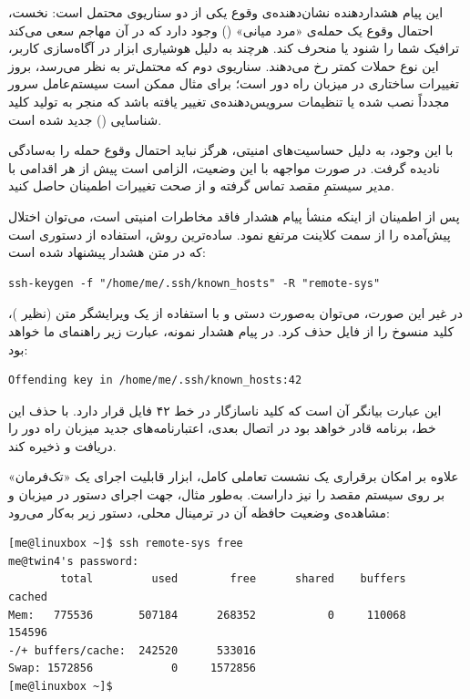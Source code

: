 این پیام هشداردهنده نشان‌دهنده‌ی وقوع یکی از دو سناریوی محتمل است: نخست، احتمال وقوع یک حمله‌ی «مرد میانی» () وجود دارد که در آن مهاجم سعی می‌کند ترافیک شما را شنود یا منحرف کند. هرچند به دلیل هوشیاری ابزار  در آگاه‌سازی کاربر، این نوع حملات کمتر رخ می‌دهند. سناریوی دوم که محتمل‌تر به نظر می‌رسد، بروز تغییرات ساختاری در میزبان راه دور است؛ برای مثال ممکن است سیستم‌عامل سرور مجدداً نصب شده یا تنظیمات سرویس‌دهنده‌ی  تغییر یافته باشد که منجر به تولید کلید شناسایی () جدید شده است.

با این وجود، به دلیل حساسیت‌های امنیتی، هرگز نباید احتمال وقوع حمله را به‌سادگی نادیده گرفت. در صورت مواجهه با این وضعیت، الزامی است پیش از هر اقدامی با مدیر سیستمِ مقصد تماس گرفته و از صحت تغییرات اطمینان حاصل کنید.

پس از اطمینان از اینکه منشأ پیام هشدار فاقد مخاطرات امنیتی است، می‌توان اختلال پیش‌آمده را از سمت کلاینت مرتفع نمود. ساده‌ترین روش، استفاده از دستوری است که در متن هشدار پیشنهاد شده است:

\begin{latin}
\begin{lstlisting}
ssh-keygen -f "/home/me/.ssh/known_hosts" -R "remote-sys"
\end{lstlisting}
\end{latin}

در غیر این صورت، می‌توان به‌صورت دستی و با استفاده از یک ویرایشگر متن (نظیر )، کلید منسوخ را از فایل  حذف کرد. در پیام هشدار نمونه، عبارت زیر راهنمای ما خواهد بود:

\begin{latin}
\begin{lstlisting}
Offending key in /home/me/.ssh/known_hosts:42
\end{lstlisting}
\end{latin}

این عبارت بیانگر آن است که کلید ناسازگار در خط ۴۲ فایل  قرار دارد. با حذف این خط، برنامه  قادر خواهد بود در اتصال بعدی، اعتبارنامه‌های جدید میزبان راه دور را دریافت و ذخیره کند.

علاوه بر امکان برقراری یک نشست تعاملی کامل، ابزار  قابلیت اجرای یک «تک‌فرمان» بر روی سیستم مقصد را نیز داراست. به‌طور مثال، جهت اجرای دستور  در میزبان  و مشاهده‌ی وضعیت حافظه آن در ترمینال محلی، دستور زیر به‌کار می‌رود:

\begin{latin}
\begin{lstlisting}
[me@linuxbox ~]$ ssh remote-sys free
me@twin4's password:
        total         used        free      shared    buffers     cached
Mem:   775536       507184      268352           0     110068     154596
-/+ buffers/cache:  242520      533016
Swap: 1572856            0     1572856
[me@linuxbox ~]$
\end{lstlisting}
\end{latin}

